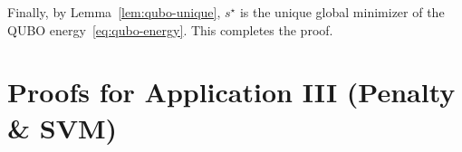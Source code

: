 \documentclass[journal]{IEEEtran}
\begin{document}
\begin{IEEEproof}
Finally, by Lemma~\ref{lem:qubo-unique}, $s^\star$ is the unique global minimizer
of the QUBO energy~\eqref{eq:qubo-energy}.
This completes the proof.
\end{IEEEproof}

\section{Proofs for Application III (Penalty \& SVM)}\label{app:penalty-proofs}
\end{document}

